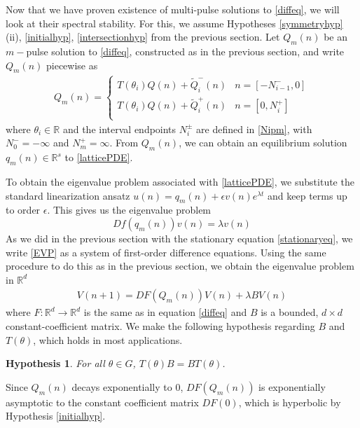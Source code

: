 \documentclass[12pt]{article}
\def\R{{\mathbb R}}
\newtheorem{hypothesis}{Hypothesis}
\begin{document}
Now that we have proven existence of multi-pulse solutions to \eqref{diffeq}, we will look at their spectral stability. For this, we assume Hypotheses \ref{symmetryhyp}(ii), \ref{initialhyp}, \ref{intersectionhyp} from the previous section. Let $Q_m(n)$ be an $m-$pulse solution to \eqref{diffeq}, constructed as in the previous section, and write $Q_m(n)$ piecewise as
\begin{align}\label{qmpiecewise}
Q_m(n) =
\begin{cases}
T(\theta_i) Q(n) + \tilde{Q}_i^-(n) & n = [-N_{i-1}^-, 0] \\
T(\theta_i) Q(n) + \tilde{Q}_i^+(n) & n = [0, N_i^+] \\
\end{cases}
\end{align}
where $\theta_i \in \R$ and the interval endpoints $N_i^\pm$ are defined in \eqref{Nipm}, with $N_0^- = -\infty$ and $N_m^+ = \infty$. From $Q_m(n)$, we can obtain an equilibrium solution $q_m(n) \in \R^s$ to \eqref{latticePDE}. 

To obtain the eigenvalue problem associated with \eqref{latticePDE}, we substitute the standard linearization ansatz $u(n) = q_m(n) + \epsilon v(n) e^{\lambda t}$ and keep terms up to order $\epsilon$. This gives us the eigenvalue problem
\begin{equation}\label{EVP}
Df(q_m(n))v(n) = \lambda v(n)
\end{equation}
As we did in the previous section with the stationary equation \eqref{stationaryeq}, we write \eqref{EVP} as a system of first-order difference equations. Using the same procedure to do this as in the previous section, we obtain the eigenvalue problem in $\R^d$
\begin{align}\label{latticeEVP}
V(n+1) = DF(Q_m(n)) V(n) + \lambda B V(n)
\end{align}
where $F: \R^d \rightarrow \R^d$ is the same as in equation \eqref{diffeq} and $B$ is a bounded, $d\times d$ constant-coefficient matrix. We make the following hypothesis regarding $B$ and $T(\theta)$, which holds in most applications.
\begin{hypothesis}\label{BTcommutehyp}
For all $\theta \in G$, $T(\theta) B = B T(\theta)$.
\end{hypothesis}
Since $Q_m(n)$ decays exponentially to 0, $DF(Q_m(n))$ is exponentially asymptotic to the constant coefficient matrix $DF(0)$, which is hyperbolic by Hypothesis \ref{initialhyp}. 
\end{document}

